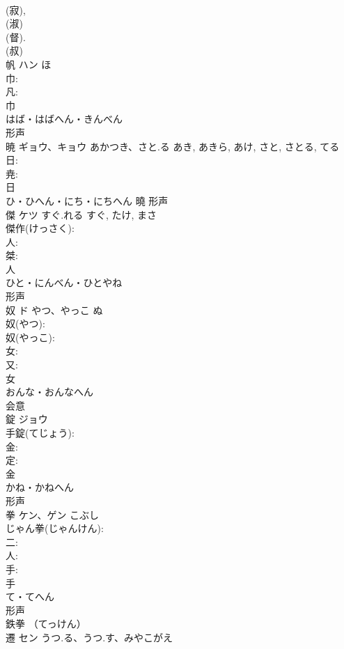 \documentclass[8pt]{extreport}
\begin{document}
\begin{CJK}{UTF8}{min}
\\	(寂), 
\\	(淑) 
\\	(督). 
\\	(叔) 
\\	帆	ハン	ほ		
\\	巾: 
\\	凡: 
\\	巾	
\\	はば・はばへん・きんべん	
\\	形声 
\\	暁	ギョウ、キョウ	あかつき、さと.る	あき, あきら, あけ, さと, さとる, てる	
\\	日: 
\\	尭: 
\\	日	
\\	ひ・ひへん・にち・にちへん	曉	形声 
\\	傑	ケツ	すぐ.れる	すぐ, たけ, まさ	
\\	傑作(けっさく): 
\\	人: 
\\	桀: 
\\	人	
\\	ひと・にんべん・ひとやね	
\\	形声 
\\	奴	ド	やつ、やっこ	ぬ	
\\	奴(やつ): 
\\	奴(やっこ): 
\\	女: 
\\	又: 
\\	女	
\\	おんな・おんなへん	
\\	会意 
\\	錠	ジョウ			
\\	手錠(てじょう): 
\\	金: 
\\	定: 
\\	金	
\\	かね・かねへん	
\\	形声 
\\	拳	ケン、ゲン	こぶし		
\\	じゃん拳(じゃんけん): 
\\	二: 
\\	人: 
\\	手: 
\\	手	
\\	て・てへん	
\\	形声 
\\	鉄拳 （てっけん） 
\\	遷	セン	うつ.る、うつ.す、みやこがえ		

\end{CJK}
\end{document}
